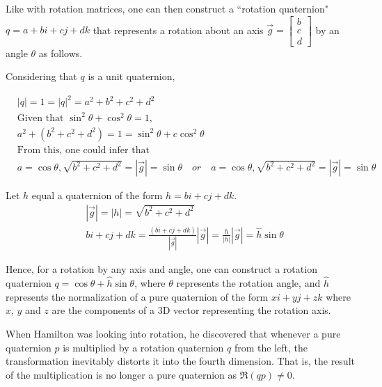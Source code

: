 \documentclass[12pt, a4paper]{article}
\begin{document}
Like with rotation matrices, one can then construct a ``rotation quaternion" $q =
a + bi + cj +dk$ that represents a rotation about an axis $\vec{g} =
\begin{bmatrix} b \\ c \\ d \end{bmatrix}$ by an angle $\theta$ as follows. %


Considering that $q$ is a unit quaternion,

\begin{align*}
    &|q| = 1 = |q|^2 = a^2 + b^2 + c^2 + d^2 \\
    &\text{Given that } \sin^2\theta + \cos^2\theta = 1, \\
    &a^2 + (b^2 + c^2 + d^2) = 1 = \sin^2\theta +c \cos^2\theta \\
    &\text{From this, one could infer that} \\
    &a = \cos\theta, \sqrt{b^2 + c^2 + d^2} = |\vec{g}| = \sin\theta \quad or \quad a = \cos\theta, \sqrt{b^2 + c^2 + d^2} = |\vec{g}| = \sin\theta 
\end{align*}

Let $h$ equal a quaternion of the form $h = bi + cj + dk$.
\begin{align*}
    &|\vec{g}| = |h| = \sqrt{b^2 + c^2 + d^2} \\
    &bi + cj + dk = \frac{(bi + cj + dk)}{|\vec{g}|}|\vec{g}| = \frac{h}{|h|}|\vec{g}| = \hat{h}\sin\theta
\end{align*}

Hence, for a rotation by any axis and angle, one can construct a rotation
quaternion $q = \cos\theta + \hat{h}\sin\theta$, where $\theta$ represents the
rotation angle, and $\hat{h}$ represents the normalization of a pure quaternion
of the form $xi + yj + zk$ where $x$, $y$ and $z$ are the components of a 3D
vector representing the rotation axis. \\

\pagebreak

When Hamilton was looking into rotation, he discovered that whenever a pure
quaternion $p$ is multiplied by a rotation quaternion $q$ from the left, the
transformation inevitably distorts it into the fourth dimension. That is, the
result of the multiplication is no longer a pure quaternion as
$\Re(qp) \neq 0$. \\
\end{document}

